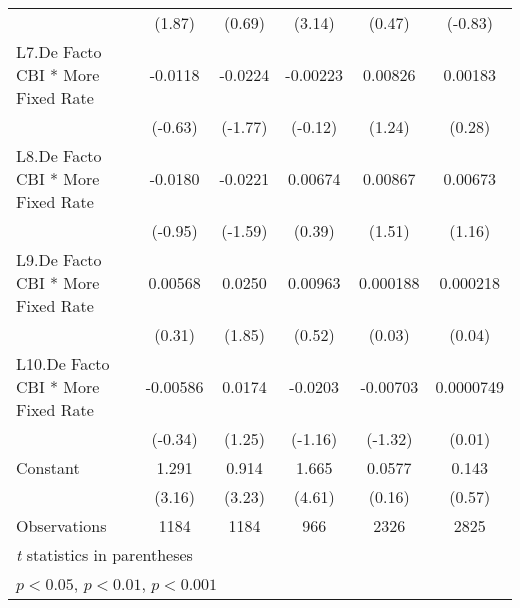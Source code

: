 {\begin{tabular}{l*{5}{c}}
                &   (1.87)         &   (0.69)         &   (3.14)         &   (0.47)         &  (-0.83)         \\
[1em]
L7.De Facto CBI * More Fixed Rate&  -0.0118         &  -0.0224         & -0.00223         &  0.00826         &  0.00183         \\
                &  (-0.63)         &  (-1.77)         &  (-0.12)         &   (1.24)         &   (0.28)         \\
[1em]
L8.De Facto CBI * More Fixed Rate&  -0.0180         &  -0.0221         &  0.00674         &  0.00867         &  0.00673         \\
                &  (-0.95)         &  (-1.59)         &   (0.39)         &   (1.51)         &   (1.16)         \\
[1em]
L9.De Facto CBI * More Fixed Rate&  0.00568         &   0.0250         &  0.00963         & 0.000188         & 0.000218         \\
                &   (0.31)         &   (1.85)         &   (0.52)         &   (0.03)         &   (0.04)         \\
[1em]
L10.De Facto CBI * More Fixed Rate& -0.00586         &   0.0174         &  -0.0203         & -0.00703         &0.0000749         \\
                &  (-0.34)         &   (1.25)         &  (-1.16)         &  (-1.32)         &   (0.01)         \\
[1em]
Constant        &    1.291\sym{**} &    0.914\sym{**} &    1.665\sym{***}&   0.0577         &    0.143         \\
                &   (3.16)         &   (3.23)         &   (4.61)         &   (0.16)         &   (0.57)         \\
\hline
Observations    &     1184         &     1184         &      966         &     2326         &     2825         \\
\hline\hline
\multicolumn{6}{l}{\footnotesize \textit{t} statistics in parentheses}\\
\multicolumn{6}{l}{\footnotesize \sym{*} \(p<0.05\), \sym{**} \(p<0.01\), \sym{***} \(p<0.001\)}\\
\end{tabular}
}
